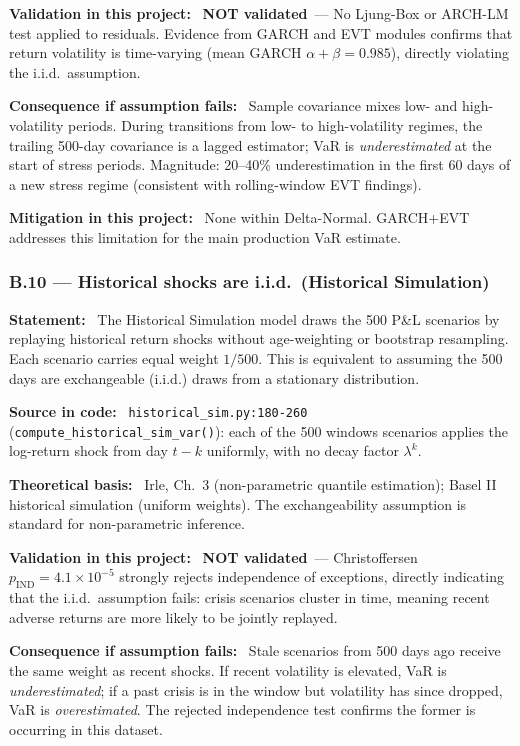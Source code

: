\documentclass[11pt,a4paper]{article}
\newcommand{\asmfield}[1]{\medskip\noindent\textbf{#1:}\ }
\newcommand{\code}[1]{\texttt{#1}}
\newcommand{\notvalidated}{\textbf{NOT validated}}
\begin{document}
\asmfield{Validation in this project}
\notvalidated\ --- No Ljung-Box or ARCH-LM test applied to residuals.
Evidence from GARCH and EVT modules confirms that return volatility is
time-varying (mean GARCH $\alpha+\beta = 0.985$), directly violating
the i.i.d.\ assumption.

\asmfield{Consequence if assumption fails}
Sample covariance mixes low- and high-volatility periods. During
transitions from low- to high-volatility regimes, the trailing 500-day
covariance is a lagged estimator; VaR is \emph{underestimated} at the
start of stress periods. Magnitude: 20--40\% underestimation in the
first 60 days of a new stress regime (consistent with rolling-window
EVT findings).

\asmfield{Mitigation in this project}
None within Delta-Normal. GARCH+EVT addresses this limitation for the
main production VaR estimate.

\subsubsection{B.10 --- Historical shocks are i.i.d.\ (Historical Simulation)}\label{asm:B10}

\asmfield{Statement}
The Historical Simulation model draws the 500 P\&L scenarios by replaying
historical return shocks without age-weighting or bootstrap resampling.
Each scenario carries equal weight $1/500$. This is equivalent to assuming
the 500 days are exchangeable (i.i.d.) draws from a stationary distribution.

\asmfield{Source in code}
\code{historical\_sim.py:180-260} (\code{compute\_historical\_sim\_var()}):
each of the 500 windows scenarios applies the log-return shock from day
$t-k$ uniformly, with no decay factor $\lambda^k$.

\asmfield{Theoretical basis}
Irle, Ch.~3 (non-parametric quantile estimation); Basel II historical
simulation (uniform weights). The exchangeability assumption is standard
for non-parametric inference.

\asmfield{Validation in this project}
\notvalidated\ --- Christoffersen $p_\mathrm{IND} = 4.1 \times 10^{-5}$
strongly rejects independence of exceptions, directly indicating that the
i.i.d.\ assumption fails: crisis scenarios cluster in time, meaning recent
adverse returns are more likely to be jointly replayed.

\asmfield{Consequence if assumption fails}
Stale scenarios from 500 days ago receive the same weight as recent shocks.
If recent volatility is elevated, VaR is \emph{underestimated}; if a past
crisis is in the window but volatility has since dropped, VaR is
\emph{overestimated}. The rejected independence test confirms the former
is occurring in this dataset.
\end{document}

